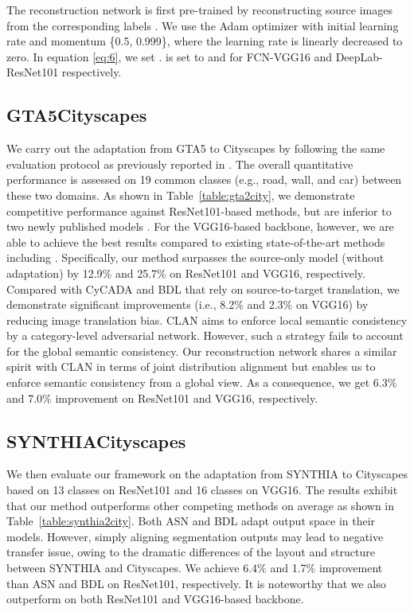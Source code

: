 \documentclass[runningheads]{llncs}
\begin{document}
	The reconstruction network is first pre-trained by reconstructing source images  from the corresponding labels . We use the Adam optimizer with initial learning rate  and momentum \{0.5, 0.999\}, where the learning rate is linearly decreased to zero. In equation \ref{eq:6}, we set .  is set to  and  for FCN-VGG16 and DeepLab-ResNet101 respectively.
	
	
	\subsection{GTA5Cityscapes}


	We carry out the adaptation from GTA5 to Cityscapes by following the same evaluation protocol as previously reported in \cite{tsai2018learning,li2019bidirectional}. The overall quantitative performance is assessed on 19 common classes (e.g., road, wall, and car) between these two domains. As shown in Table~\ref{table:gta2city}, we demonstrate competitive performance against ResNet101-based methods, but are inferior to two newly published models \cite{kim2020learning,yang2020fda}. For the VGG16-based backbone, however, we are able to achieve the best results compared to existing state-of-the-art methods including \cite{kim2020learning,yang2020fda}. Specifically, our method surpasses the source-only model (without adaptation) by 12.9\% and 25.7\% on ResNet101 and VGG16, respectively. Compared with CyCADA \cite{hoffman2017cycada} and BDL \cite{li2019bidirectional} that rely on source-to-target translation, we demonstrate significant improvements (i.e., 8.2\% and 2.3\% on VGG16) by reducing image translation bias. CLAN \cite{luo2019taking} aims to enforce local semantic consistency by a category-level adversarial network. However, such a strategy fails to account for the global semantic consistency. Our reconstruction network shares a similar spirit with CLAN in terms of joint distribution alignment but enables us to enforce semantic consistency from a global view. As a consequence, we get 6.3\% and 7.0\% improvement on ResNet101 and VGG16, respectively. 
	
	\subsection{SYNTHIACityscapes}


	We then evaluate our framework on the adaptation from SYNTHIA to Cityscapes based on 13 classes on ResNet101 and 16 classes on VGG16. The results exhibit that our method outperforms other competing methods on average as shown in Table~\ref{table:synthia2city}. Both ASN \cite{tsai2018learning} and BDL \cite{li2019bidirectional} adapt output space in their models. However, simply aligning segmentation outputs may lead to negative transfer issue, owing to the dramatic differences of the layout and structure between SYNTHIA and Cityscapes. We achieve 6.4\% and 1.7\% improvement than ASN and BDL on ResNet101, respectively. It is noteworthy that we also outperform \cite{yang2020fda} on both ResNet101 and VGG16-based backbone.
	
\end{document}
